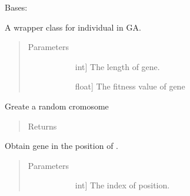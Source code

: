 \documentclass[letterpaper,10pt,english]{sphinxmanual}
\begin{document}
\begin{fulllineitems}
\label{\detokenize{pygace:pygace.ga.Cromosome}}
Bases: 

A wrapper class for individual in GA.
\begin{quote}\begin{description}
\item[{Parameters}] \leavevmode\begin{description}
\item[{}] \leavevmode{[}int{]}
The length of gene.

\item[{}] \leavevmode{[}float{]}
The fitness value of gene

\end{description}

\end{description}\end{quote}

\begin{fulllineitems}
\label{\detokenize{pygace:pygace.ga.Cromosome.generate_cromosome}}
Greate a random cromosome
\begin{quote}\begin{description}
\item[{Returns}] \leavevmode\begin{description}
\item[{}] \leavevmode
\end{description}

\end{description}\end{quote}

\end{fulllineitems}


\begin{fulllineitems}
\label{\detokenize{pygace:pygace.ga.Cromosome.get_gene}}
Obtain gene in the position of .
\begin{quote}\begin{description}
\item[{Parameters}] \leavevmode\begin{description}
\item[{}] \leavevmode{[}int{]}
The index of position.


\end{description}
\end{description}
\end{quote}
\end{fulllineitems}
\end{fulllineitems}
\end{document}

